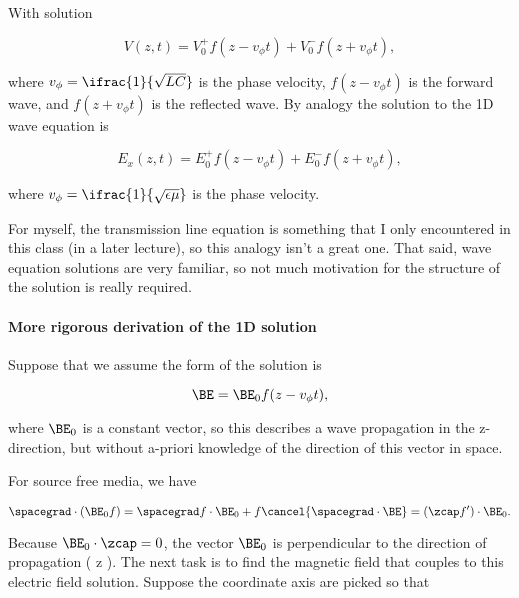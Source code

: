With solution

\begin{equation}\label{eqn:uwavesLecture2:280}
V(z, t) =
V_0^{+} f(z - v_\phi t)
+
V_0^{-} f(z + v_\phi t),
\end{equation}

where \( v_\phi = \ifrac{1}{\sqrt{L C}} \) is the phase velocity, \( f(z - v_\phi t)\) is the forward wave, and \( f(z + v_\phi t) \) is the reflected wave.  By analogy the solution to the 1D wave equation is

\begin{equation}\label{eqn:uwavesLecture2:300}
E_x(z, t) =
E_0^{+} f(z - v_\phi t)
+
E_0^{-} f(z + v_\phi t),
\end{equation}

where \( v_\phi = \ifrac{1}{\sqrt{\epsilon \mu}} \) is the phase velocity.

For myself, the transmission line equation is something that I only encountered in this class (in a later lecture), so this analogy isn't a great one.  That said, wave equation solutions are very familiar, so not much motivation for the structure of the solution is really required.

\paragraph{More rigorous derivation of the 1D solution}

Suppose that we assume the form of the solution is

\begin{equation}\label{eqn:uwavesLecture2:320}
\BE = \BE_0 f(z - v_\phi t ),
\end{equation}

where \( \BE_0 \) is a constant vector, so this describes a wave propagation in the z-direction, but without a-priori knowledge of the direction of this vector in space.

For source free media, we have

\begin{dmath}\label{eqn:uwavesLecture2:340}
\spacegrad \cdot ( \BE_0 f )
= \spacegrad f \cdot \BE_0 + f \cancel{ \spacegrad \cdot \BE }
= (\zcap f') \cdot \BE_0.
\end{dmath}

Because \( \BE_0 \cdot \zcap = 0 \), the vector \( \BE_0 \) is perpendicular to the direction of propagation ( z ).  The next task is to find the magnetic field that couples to this electric field solution.  Suppose the coordinate axis are picked so that

